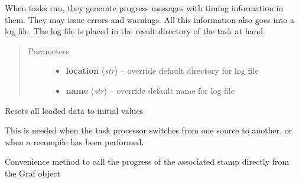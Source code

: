 \documentclass[letterpaper,10pt,english]{sphinxmanual}
\begin{document}
\begin{fulllineitems}
\begin{fulllineitems}
When tasks run, they generate progress messages with timing information in them.
They may issue errors and warnings. All this information also goes into a log file.
The log file is placed in the result directory of the task at hand.
\begin{quote}\begin{description}
\item[{Parameters}] \leavevmode\begin{itemize}
\item {} 
\textbf{location} (\emph{str}) --
override default directory for log file

\item {} 
\textbf{name} (\emph{str}) --
override default name for log file

\end{itemize}

\end{description}\end{quote}

\end{fulllineitems}


\begin{fulllineitems}
\label{graf/graf:graf.Graf.env}
\end{fulllineitems}


\begin{fulllineitems}
\label{graf/graf:graf.Graf.init_data}
Resets all loaded data to initial values

This is needed when the task processor switches from one source to another,
or when a recompile has been performed.

\end{fulllineitems}


\begin{fulllineitems}
\label{graf/graf:graf.Graf.log}
\end{fulllineitems}


\begin{fulllineitems}
\label{graf/graf:graf.Graf.progress}
Convenience method to call the progress of the associated stamp directly from the Graf object


\end{fulllineitems}
\end{fulllineitems}
\end{document}
